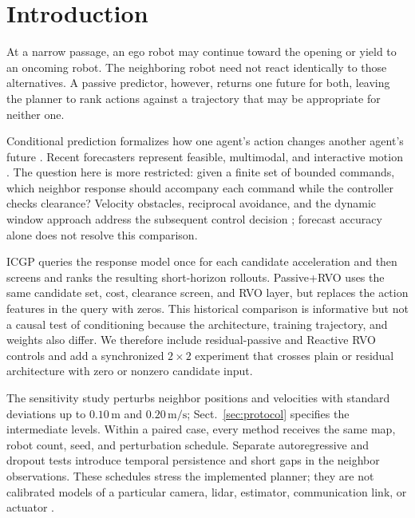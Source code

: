 \documentclass[pdflatex,sn-mathphys-num]{sn-jnl}
\begin{document}


\maketitle

\section{Introduction}
\label{sec:introduction}

At a narrow passage, an ego robot may continue toward the opening or yield to an oncoming robot. The neighboring robot need not react identically to those alternatives. A passive predictor, however, returns one future for both, leaving the planner to rank actions against a trajectory that may be appropriate for neither one.

Conditional prediction formalizes how one agent's action changes another agent's future \cite{tolstaya2021}. Recent forecasters represent feasible, multimodal, and interactive motion \cite{salzmann2020,shi2022,nayakanti2023,varadarajan2022,chai2020,mohamed2020,kothari2022,ettinger2021,chang2019}. The question here is more restricted: given a finite set of bounded commands, which neighbor response should accompany each command while the controller checks clearance? Velocity obstacles, reciprocal avoidance, and the dynamic window approach address the subsequent control decision \cite{fiorini1998,vandenberg2011,fox1997}; forecast accuracy alone does not resolve this comparison.

ICGP queries the response model once for each candidate acceleration and then screens and ranks the resulting short-horizon rollouts. Passive+RVO uses the same candidate set, cost, clearance screen, and RVO layer, but replaces the action features in the query with zeros. This historical comparison is informative but not a causal test of conditioning because the architecture, training trajectory, and weights also differ. We therefore include residual-passive and Reactive RVO controls and add a synchronized $2\times2$ experiment that crosses plain or residual architecture with zero or nonzero candidate input.

The sensitivity study perturbs neighbor positions and velocities with standard deviations up to $0.10\,\mathrm{m}$ and $0.20\,\mathrm{m/s}$; Sect.~\ref{sec:protocol} specifies the intermediate levels. Within a paired case, every method receives the same map, robot count, seed, and perturbation schedule. Separate autoregressive and dropout tests introduce temporal persistence and short gaps in the neighbor observations. These schedules stress the implemented planner; they are not calibrated models of a particular camera, lidar, estimator, communication link, or actuator \cite{zhu2022,garg2024}.
\end{document}
